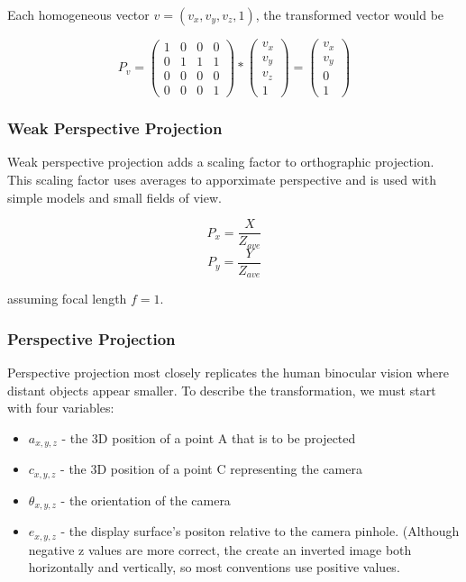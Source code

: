 \documentclass{article}
\begin{document}
Each homogeneous vector $v = (v_x, v_y, v_z, 1)$, the transformed vector would be

\[P_{v} = \begin{pmatrix}
  1 & 0 & 0 & 0 \\
  0 & 1 & 1 & 1 \\
  0 & 0 & 0 & 0 \\
  0 & 0 & 0 & 1 
 \end{pmatrix}	
*
\begin{pmatrix}
  v_{x} \\
  v_{y} \\
  v_{z} \\
  1
 \end{pmatrix}	
=
\begin{pmatrix}
  v_{x} \\
  v_{y} \\
  0 \\
  1
 \end{pmatrix}\]

\subsubsection{Weak Perspective Projection}
Weak perspective projection adds a scaling factor to orthographic projection. This scaling factor uses averages to apporximate perspective and is used with simple models and small fields of view.

  \[P_{x} =  \frac{X}{Z_{ave}}\]
  \[P_{y} =  \frac{Y}{Z_{ave}}\]

assuming focal length $f = 1$.

\subsubsection{Perspective Projection}
Perspective projection most closely replicates the human binocular vision where distant objects appear smaller. To describe the transformation, we must start with four variables:

\begin{itemize}
  \item $a_{x, y, z}$ - the 3D position of a point A that is to be projected
  \item $c_{x, y, z}$ - the 3D position of a point C representing the camera
  \item $\theta_{x, y, z}$ - the orientation of the camera
  \item $e_{x, y, z}$ - the display surface's positon relative to the camera pinhole. (Although negative z values are more correct, the create an inverted image both horizontally and vertically, so most conventions use positive values.
\end{itemize}
\end{document}

